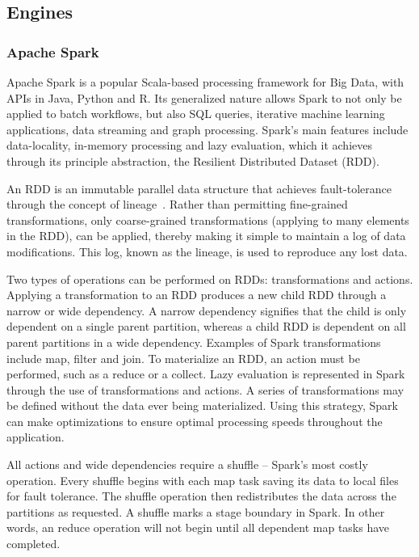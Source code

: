 \documentclass{IEEEtran}
\newcommand{\todo}[1]{\marginpar{\parbox{18mm}{\flushleft\tiny\color{red}\textbf{TODO}:
      #1}}}
\begin{document}
\subsection{Engines} %

\subsubsection{Apache Spark}

Apache Spark is a popular Scala-based processing framework for Big Data, with
APIs in Java, Python and R. Its 
generalized nature allows Spark to not only be applied to batch workflows,
but also SQL queries, iterative machine learning applications, 
data streaming and graph processing. Spark's
main features include data-locality, in-memory processing and lazy evaluation,
which it achieves through its principle abstraction, the Resilient Distributed 
Dataset (RDD). 

An RDD is an immutable parallel data structure that achieves fault-tolerance 
through the concept of lineage~\cite{zaharia2010spark}. Rather than permitting
fine-grained transformations, only coarse-grained transformations (applying to
many elements in the RDD), can be applied, thereby making it simple to maintain a 
log of data modifications. This log, known as the lineage, is used
to reproduce any lost data.

Two types of operations can be performed on RDDs:
transformations and actions. Applying a transformation to an RDD produces a new
child RDD through a narrow or wide dependency. A narrow dependency signifies 
that the child is only dependent on a single parent partition, whereas a child 
RDD is dependent on all parent partitions in a wide dependency. Examples of 
Spark transformations include map, filter and join. To materialize an RDD, an
action must be performed, such as a reduce or a collect. Lazy evaluation is 
represented in Spark through the use of transformations and actions. A series of
transformations may be defined without the data ever being materialized. Using 
this strategy, Spark can make optimizations to ensure optimal processing speeds 
throughout the application.


All actions and wide dependencies require a shuffle -- Spark's most costly
operation. Every shuffle begins with each map task saving its data to local
files for fault tolerance. The shuffle operation then 
redistributes the data across the partitions as requested. A shuffle marks a 
stage boundary in Spark. In other words, an reduce operation  will not begin 
until all 
dependent map tasks have completed.
\end{document}
